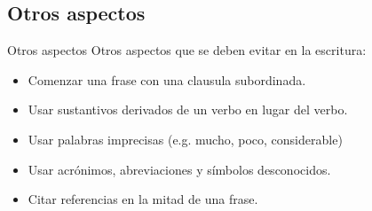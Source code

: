 \documentclass[
10pt,
aspectratio=169,
]{beamer}
\begin{document}
\subsection{Otros aspectos}
\begin{frame}[c]{Otros aspectos}
Otros aspectos que se deben evitar en la escritura:
\begin{itemize}
\item Comenzar una frase con una clausula subordinada.
\item Usar sustantivos derivados de un verbo en lugar del verbo.
\item Usar palabras imprecisas (e.g. mucho, poco, considerable)
\item Usar acr\'onimos, abreviaciones y s\'imbolos desconocidos.
\item Citar referencias en la mitad de una frase.
\end{itemize}
\end{frame}
\end{document}
